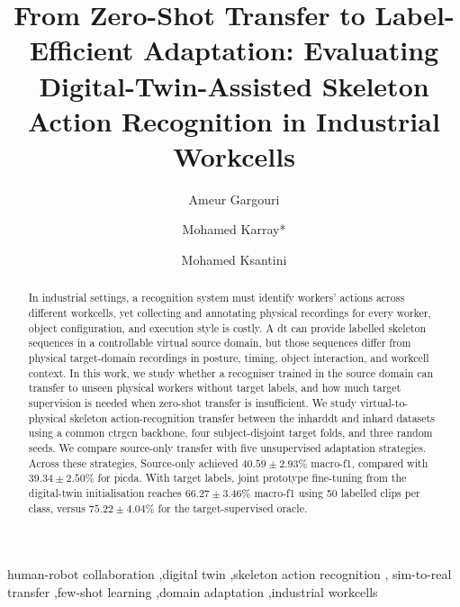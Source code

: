 \documentclass[3p,times,procedia]{elsarticle}
\begin{document}
\begin{frontmatter}


  \title{From Zero-Shot Transfer to Label-Efficient Adaptation: Evaluating Digital-Twin-Assisted Skeleton Action Recognition in Industrial Workcells}

  \author[a,b]{Ameur Gargouri}
  \author[b]{Mohamed Karray*}
  \author[a]{Mohamed Ksantini}

  \address[a]{ATISP Lab, ENET'Com, University of Sfax, Sfax, Tunisia}
  \address[b]{ESME Research Lab, Ivry-sur-Seine, France}

  \begin{abstract}
    In industrial settings, a recognition system must identify workers' actions
    across different workcells,
    yet collecting and annotating physical recordings for every worker, object
    configuration, and execution style is costly. A \ac{dt} can provide
    labelled skeleton sequences in a controllable virtual source domain, but
    those sequences differ from physical target-domain recordings in posture,
    timing, object interaction, and workcell context. In this work, we study
    whether a recogniser trained in the source domain can transfer to unseen
    physical workers without target labels, and how much target supervision is
    needed when zero-shot transfer is insufficient. We study virtual-to-physical
    skeleton action-recognition transfer between the \ac{inharddt} and
    \ac{inhard} datasets using a common \ac{ctrgcn} backbone, four
    subject-disjoint target folds, and three random seeds. We compare source-only transfer with five
    unsupervised adaptation strategies. Across these strategies, Source-only achieved
    $40.59\pm2.93\%$ macro-\ac{f1}, compared with $39.34\pm2.50\%$ for
    \ac{picda}. With target labels, joint prototype
    fine-tuning from the digital-twin initialisation reaches
    $66.27\pm3.46\%$ macro-\ac{f1} using 50 labelled clips per class, versus
    $75.22\pm4.04\%$ for the target-supervised oracle.
  \end{abstract}

  \begin{keyword}
    human-robot collaboration \sep digital twin \sep skeleton action recognition \sep
    sim-to-real transfer \sep few-shot learning \sep domain adaptation \sep industrial
    workcells
  \end{keyword}
\end{frontmatter}
\end{document}
